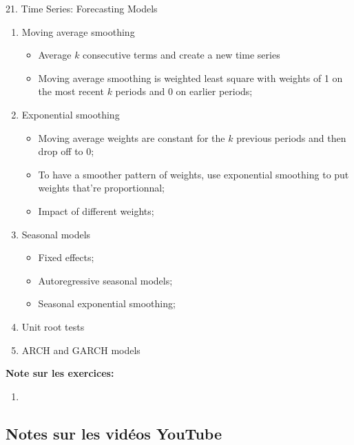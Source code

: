 \documentclass[12pt, titlepage, french]{report}
\begin{document}
\begin{CHPT_SUMM}{21. Time Series: Forecasting Models}
\begin{enumerate}
	\item	Moving average smoothing
	\begin{itemize}
		\item	Average $k$ consecutive terms and create a new time series
		\item	Moving average smoothing is weighted least square with weights of 1 on the most recent $k$ periods and 0 on earlier periods;
	\end{itemize}
	\item	Exponential smoothing
	\begin{itemize}
		\item	Moving average weights are constant for the $k$ previous periods and then drop off to 0;
		\item	To have a smoother pattern of weights, use exponential smoothing to put weights that're proportionnal;
		\item	Impact of different weights;
	\end{itemize}
	\item	Seasonal models
	\begin{itemize}
		\item	Fixed effects;
		\item	Autoregressive seasonal models;
		\item	Seasonal exponential smoothing;
	\end{itemize}
	\item	Unit root tests
	\item	ARCH and GARCH models
\end{enumerate}
\textbf{Note sur les exercices:} 
\begin{enumerate}
	\item	
\end{enumerate}
\end{CHPT_SUMM}

\subsection{Notes sur les vidéos YouTube}
\end{document}
